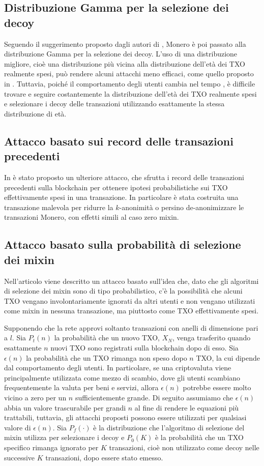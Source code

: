 \subsection{Distribuzione Gamma per la selezione dei decoy}
Seguendo il suggerimento proposto dagli autori di \cite{art:4}, Monero è poi passato alla distribuzione Gamma per la selezione dei decoy. L'uso di una distribuzione migliore, cioè una distribuzione più vicina alla distribuzione dell'età dei TXO realmente spesi, può rendere alcuni attacchi meno efficaci, come quello proposto in \cite{art:2}. Tuttavia, poiché il comportamento degli utenti cambia nel tempo \cite{art:7}, è difficile trovare e seguire costantemente la distribuzione dell'età dei TXO realmente spesi e selezionare i decoy delle transazioni utilizzando esattamente la stessa distribuzione di età.

\subsection{Attacco basato sui record delle transazioni precedenti}
In \cite{art:5} è stato proposto un ulteriore attacco, che sfrutta i record delle transazioni precedenti sulla blockchain per ottenere ipotesi probabilistiche sui TXO effettivamente spesi in una transazione. In particolare è stata costruita una transazione malevola per ridurre la $k$-anonimità o persino de-anonimizzare le transazioni Monero, con effetti simili al caso zero mixin.

\subsection{Attacco basato sulla probabilità di selezione dei mixin}
Nell'articolo \cite{art:new} viene descritto un attacco basato sull'idea che, dato che gli algoritmi di selezione dei mixin sono di tipo probabilistico, c'è la possibilità che alcuni TXO vengano involontariamente ignorati da altri utenti e non vengano utilizzati come mixin in nessuna transazione, ma piuttosto come TXO effettivamente spesi.

Supponendo che la rete approvi soltanto transazioni con anelli di dimensione pari a $l$. Sia \( P_t(n) \) la probabilità che un nuovo TXO, \( X_N \), venga trasferito quando esattamente \( n \) nuovi TXO sono registrati sulla blockchain dopo di esso. Sia $\epsilon(n)$ la probabilità che un TXO rimanga non speso dopo $n$ TXO, la cui dipende dal comportamento degli utenti. In particolare, se una criptovaluta viene principalmente utilizzata come mezzo di scambio, dove gli utenti scambiano frequentemente la valuta per beni e servizi, allora \(\epsilon(n)\) potrebbe essere molto vicino a zero per un \( n \) sufficientemente grande. Di seguito assumiamo che \(\epsilon(n)\) abbia un valore trascurabile per grandi \( n \) al fine di rendere le equazioni più trattabili, tuttavia, gli attacchi proposti possono essere utilizzati per qualsiasi valore di \(\epsilon(n)\).  Sia \( P_f(\cdot) \) è la distribuzione che l'algoritmo di selezione del mixin utilizza per selezionare i decoy e $P_{0}(K)$ è la probabilità che un TXO specifico rimanga ignorato per $K$ transazioni, cioè non utilizzato come decoy nelle successive $K$ transazioni, dopo essere stato emesso.


